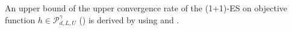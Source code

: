 \documentclass[journal]{IEEEtran}
\renewcommand{\leq}{\leqslant} %
\theoremstyle{definition}
\newcommand{\yohe}[1]{{\color{cyan}Y.A.: #1}}
\newcommand{\mori}[1]{{\color[rgb]{0.22, 0.71, 0.55} MORINAGA :  #1}}
\newcommand{\aup}{\alpha_{\uparrow}}
\newcommand{\adown}{\alpha_{\downarrow}}
\begin{document}
%    

An upper bound of the upper convergence rate of the (1+1)-ES on objective function $h\in\mathcal{P}_{d, L, U}^\gamma$ () is derived by using  and .
\end{document}
